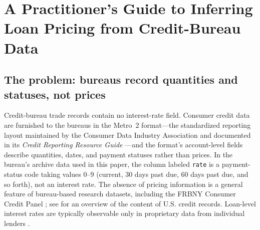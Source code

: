 %

\section{A Practitioner's Guide to Inferring Loan Pricing from Credit-Bureau Data}\label{appendix:rateimputation}

\subsection{The problem: bureaus record quantities and statuses, not prices}

Credit-bureau trade records contain no interest-rate field. Consumer credit data are furnished to the bureaus in the Metro~2 format---the standardized reporting layout maintained by the Consumer Data Industry Association and documented in its \emph{Credit Reporting Resource Guide} \citep{cdia_credit_nodate}---and the format's account-level fields describe quantities, dates, and payment statuses rather than prices. In the bureau's archive data used in this paper, the column labeled \texttt{rate} is a payment-status code taking values 0--9 (current, 30 days past due, 60 days past due, and so forth), not an interest rate. The absence of pricing information is a general feature of bureau-based research datasets, including the FRBNY Consumer Credit Panel \citep{lee_introduction_2010}; see \citet{avery_overview_2003} for an overview of the content of U.S. credit records. Loan-level interest rates are typically observable only in proprietary data from individual lenders \citep[e.g.,][]{einav_contract_2012}.


